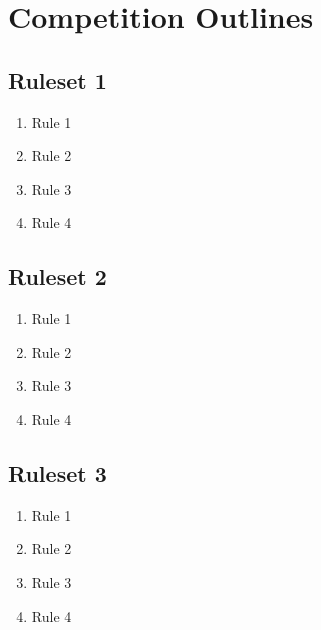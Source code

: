 \section{Competition Outlines}

\subsection{Ruleset 1}
\begin{enumerate}
	\item Rule 1
	\item Rule 2
	\item Rule 3
	\item Rule 4
\end{enumerate}  

\subsection{Ruleset 2}
\begin{enumerate}
	\item Rule 1
	\item Rule 2
	\item Rule 3
	\item Rule 4
\end{enumerate}  

\subsection{Ruleset 3}
\begin{enumerate}
	\item Rule 1
	\item Rule 2
	\item Rule 3
	\item Rule 4
\end{enumerate}